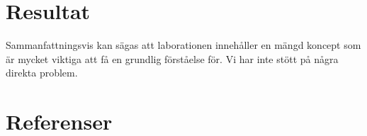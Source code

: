 \documentclass[11pt,a4paper]{article}
\begin{document}
\section{Resultat}\label{setup}
Sammanfattningsvis kan sägas att laborationen innehåller en mängd koncept som
är mycket viktiga att få en grundlig förståelse för. Vi har inte stött på några
direkta problem.

\newpage

\section{Referenser}\label{refs}




\end{document}
